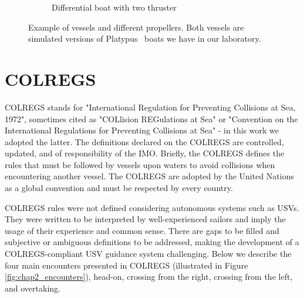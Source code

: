 \begin{figure}[H]
\begin{subfigure}[b]{0.52\textwidth}
            \caption{Differential boat with two thruster}
            \label{fig:chap2_diffboat}
        \end{subfigure}
    
    \caption{Example of vessels and different propellers. Both vessels are simulated versions of Platypus~\cite{PlatypusLLC} boats we have in our laboratory.}
    \label{fig:boats}
    \end{figure}

\section{COLREGS}
\label{sec:colregs}


    \ac{COLREGS}\cite{COLREGS} stands for "International Regulation for Preventing Collisions at Sea, 1972", sometimes cited as "COLlision REGulations at Sea" or "Convention on the International Regulations for Preventing Collisions at Sea" - in this work we adopted the latter. The definitions declared on the \ac{COLREGS} are controlled, updated, and of responsibility of the \ac{IMO}. Briefly, the \ac{COLREGS} defines the rules that must be followed by vessels upon waters to avoid collisions when encountering another vessel. 
    The \ac{COLREGS} are adopted by the United Nations as a global convention and must be respected by every country.
    
    
    \ac{COLREGS} rules were not defined considering autonomous systems such as \ac{USV}s. They were written to be interpreted by well-experienced sailors and imply the usage of their experience and common sense. There are gaps to be filled and subjective or ambiguous definitions to be addressed, making the development of a \ac{COLREGS}-compliant \ac{USV} guidance system challenging.
    Below we describe the four main encounters presented in \ac{COLREGS} (illustrated in Figure \ref{fig:chap2_encounters}), head-on, crossing from the right, crossing from the left, and overtaking.
    
